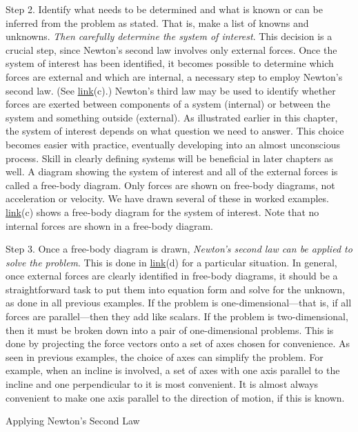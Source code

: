 \documentclass[
]{book}
\begin{document}
Step 2. Identify what needs to be determined and what is known or can be
inferred from the problem as stated. That is, make a list of knowns and
unknowns. \emph{Then carefully determine the system of interest}. This
decision is a crucial step, since Newton's second law involves only
external forces. Once the system of interest has been identified, it
becomes possible to determine which forces are external and which are
internal, a necessary step to employ Newton's second law. (See
\protect\hyperlink{import-auto-id1669409}{link}(c).) Newton's
third law may be used to identify whether forces are exerted between
components of a system (internal) or between the system and something
outside (external). As illustrated earlier in this chapter, the system
of interest depends on what question we need to answer. This choice
becomes easier with practice, eventually developing into an almost
unconscious process. Skill in clearly defining systems will be
beneficial in later chapters as well. {\hfill\break
}{\hfill\break
}A diagram showing the system of interest and all
of the external forces is called a \protect\hypertarget{import-auto-id1606094}{}{free-body
diagram}. Only forces are shown
on free-body diagrams, not acceleration or velocity. We have drawn
several of these in worked examples.
\protect\hyperlink{import-auto-id1669409}{link}(c) shows a
free-body diagram for the system of interest. Note that no internal
forces are shown in a free-body diagram.

Step 3. Once a free-body diagram is drawn, \emph{Newton's second law can be
applied to solve the problem}. This is done in
\protect\hyperlink{import-auto-id1669409}{link}(d) for a
particular situation. In general, once external forces are clearly
identified in free-body diagrams, it should be a straightforward task to
put them into equation form and solve for the unknown, as done in all
previous examples. If the problem is one-dimensional---that is, if all
forces are parallel---then they add like scalars. If the problem is
two-dimensional, then it must be broken down into a pair of
one-dimensional problems. This is done by projecting the force vectors
onto a set of axes chosen for convenience. As seen in previous examples,
the choice of axes can simplify the problem. For example, when an
incline is involved, a set of axes with one axis parallel to the incline
and one perpendicular to it is most convenient. It is almost always
convenient to make one axis parallel to the direction of motion, if this
is known.

\hypertarget{fs-id1316241}{}
Applying Newton's Second Law
\end{document}
